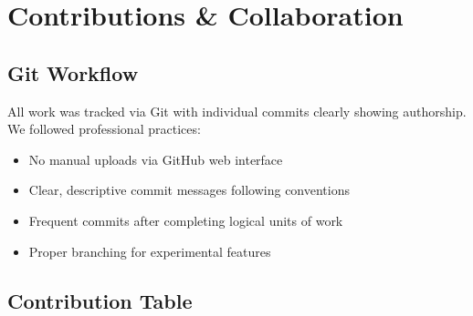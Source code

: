 \documentclass[12pt,a4paper]{article}
\begin{document}
\section{Contributions \& Collaboration}

\subsection{Git Workflow}
All work was tracked via Git with individual commits clearly showing authorship. We followed professional practices:
\begin{itemize}
    \item No manual uploads via GitHub web interface
    \item Clear, descriptive commit messages following conventions
    \item Frequent commits after completing logical units of work
    \item Proper branching for experimental features
\end{itemize}

\subsection{Contribution Table}
\end{document}
